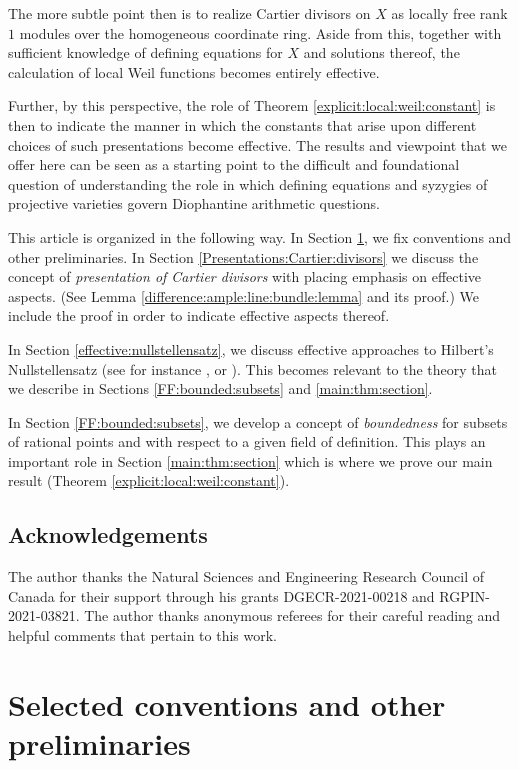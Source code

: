 \documentclass[10pt]{amsart}
\theoremstyle{definition}
\numberwithin{equation}{section}
\begin{document}
The more subtle point then is to realize Cartier divisors on $X$ as locally free rank $1$ modules over the homogeneous coordinate ring.   Aside from this, together with sufficient knowledge of defining equations for $X$ and solutions thereof, the calculation of local Weil functions becomes entirely effective.  

Further, by this perspective, the role of Theorem \ref{explicit:local:weil:constant} is then to indicate the manner in which the constants that arise upon different choices of such presentations become effective.  The results and viewpoint that we offer here  can be seen as a starting point to the difficult and foundational question of understanding the role in which defining equations and syzygies of projective varieties govern Diophantine arithmetic questions.  

This article is organized in the following way.  In Section \ref{abs:values:conventions}, we fix conventions and other preliminaries.  In Section \ref{Presentations:Cartier:divisors} we discuss the concept of \emph{presentation of Cartier divisors} with placing emphasis on effective aspects. (See Lemma \ref{difference:ample:line:bundle:lemma} and its proof.)  We include the proof in order to indicate effective aspects thereof.

In Section \ref{effective:nullstellensatz}, we discuss effective approaches to Hilbert's Nullstellensatz (see for instance \cite{Masser:Wustholz:1983}, \cite{Kollar:1999} or \cite{Jelonek:2005}).  This becomes relevant to the theory that we describe in Sections \ref{FF:bounded:subsets} and \ref{main:thm:section}.   

In Section \ref{FF:bounded:subsets}, we develop a concept of \emph{boundedness} for subsets of rational points and with respect to a given field of definition.  This plays an important role in Section \ref{main:thm:section} which is where we prove our main result (Theorem \ref{explicit:local:weil:constant}).

\subsection*{Acknowledgements}  The author thanks the Natural Sciences and Engineering Research Council of Canada for their support through his grants DGECR-2021-00218 and RGPIN-2021-03821.  The author thanks anonymous referees for their careful reading and helpful comments that pertain to this work.

\section{Selected conventions and other preliminaries}\label{abs:values:conventions}
\end{document}
